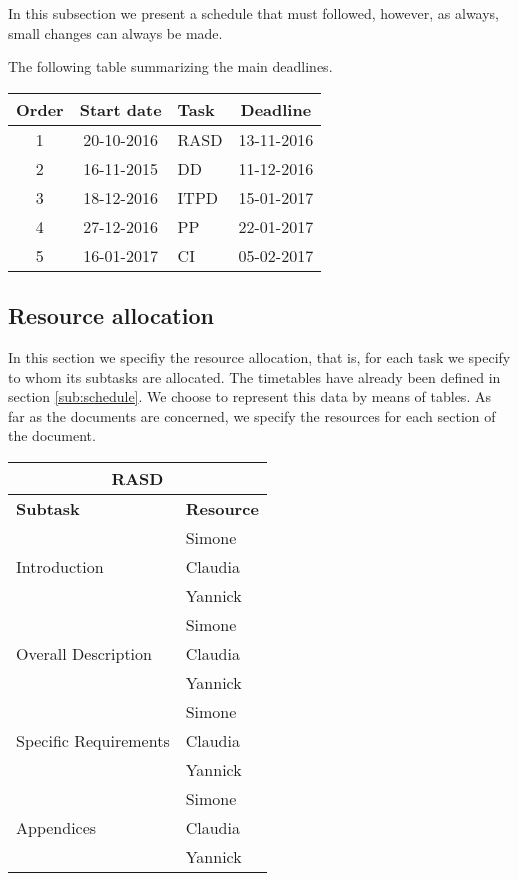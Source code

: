 In this subsection we present a schedule that must followed, however, as always, small changes can always be made.




The following table summarizing the main deadlines.

\begin{center}
\begin{tabular}{ |c|c|l|c| } \hline
	\textbf{Order} & \textbf{Start date} & \textbf{Task} & \textbf{Deadline} \\ \hline
	1 & 20-10-2016 & RASD & 13-11-2016 \\ \hline
	2 & 16-11-2015 & DD & 11-12-2016 \\ \hline
	3 & 18-12-2016 & ITPD & 15-01-2017 \\ \hline
	4 & 27-12-2016 & PP & 22-01-2017 \\ \hline
	5 & 16-01-2017 & CI & 05-02-2017 \\ \hline
\end{tabular}
\end{center}

\subsection{Resource allocation}
In this section we specifiy the resource allocation, that is, for each task we specify to whom its subtasks are allocated. The timetables have already been defined in section \ref{sub:schedule}.
We choose to represent this data by means of tables. As far as the documents are concerned, we specify the resources for each section of the document.  

\begin{center}
\begin{tabular}{ |l|l| }
	\multicolumn{2}{c}{\textbf{RASD}} \\ \hline
	\textbf{Subtask} & \textbf{Resource} \\ \hline
	\multirow{3}{*}{Introduction} & Simone \\
										& Claudia \\
										& Yannick \\ \hline
	\multirow{3}{*}{Overall Description} & Simone \\
										& Claudia \\
										& Yannick \\ \hline
	\multirow{3}{*}{Specific Requirements} & Simone \\
										& Claudia \\
										& Yannick \\ \hline
	\multirow{3}{*}{Appendices} & Simone \\ 
				& Claudia \\
				& Yannick \\ \hline

\end{tabular}
\end{center}


